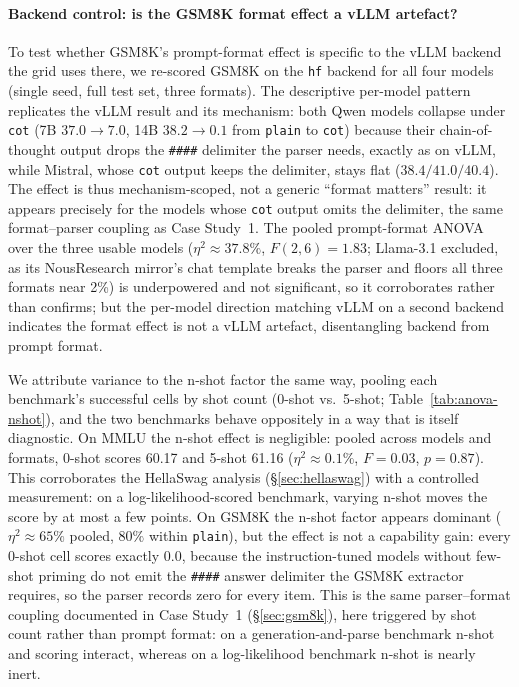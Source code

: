 \documentclass[11pt]{article}
\begin{document}
\paragraph{Backend control: is the GSM8K format effect a vLLM artefact?} To test
whether GSM8K's prompt-format effect is specific to the vLLM backend the grid uses
there, we re-scored GSM8K on the \texttt{hf} backend for all four models (single
seed, full test set, three formats). The descriptive per-model pattern replicates
the vLLM result and its mechanism: both Qwen models collapse under \texttt{cot}
(7B $37.0{\to}7.0$, 14B $38.2{\to}0.1$ from \texttt{plain} to \texttt{cot}) because
their chain-of-thought output drops the \texttt{\#\#\#\#} delimiter the parser
needs, exactly as on vLLM, while Mistral, whose \texttt{cot} output keeps the
delimiter, stays flat ($38.4/41.0/40.4$). The effect is thus mechanism-scoped, not
a generic ``format matters'' result: it appears precisely for the models whose
\texttt{cot} output omits the delimiter, the same format--parser coupling as Case
Study~1. The pooled prompt-format ANOVA over the three usable models
($\eta^2 \approx 37.8\%$, $F(2,6)=1.83$; Llama-3.1 excluded, as its NousResearch
mirror's chat template breaks the parser and floors all three formats near 2\%) is
underpowered and not significant, so it corroborates rather than confirms; but the
per-model direction matching vLLM on a second backend indicates the format effect
is not a vLLM artefact, disentangling backend from prompt format.

We attribute variance to the n-shot factor the same way, pooling each
benchmark's successful cells by shot count (0-shot vs.\ 5-shot;
Table~\ref{tab:anova-nshot}), and the two benchmarks behave oppositely in a
way that is itself diagnostic. On MMLU the n-shot effect is negligible:
pooled across models and formats, 0-shot scores 60.17 and 5-shot 61.16
(\(\eta^2 \approx 0.1\%\), \(F = 0.03\), \(p = 0.87\)). This corroborates
the HellaSwag analysis (\S\ref{sec:hellaswag}) with a controlled
measurement: on a log-likelihood-scored benchmark, varying n-shot moves the
score by at most a few points. On GSM8K the n-shot factor appears dominant
(\(\eta^2 \approx 65\%\) pooled, \(80\%\) within \texttt{plain}), but the
effect is not a capability gain: every 0-shot cell scores exactly 0.0,
because the instruction-tuned models without few-shot priming do not emit
the \texttt{\#\#\#\#} answer delimiter the GSM8K extractor requires, so the
parser records zero for every item. This is the same parser--format
coupling documented in Case Study~1 (\S\ref{sec:gsm8k}), here triggered by
shot count rather than prompt format: on a generation-and-parse benchmark
n-shot and scoring interact, whereas on a log-likelihood benchmark n-shot is
nearly inert.
\end{document}
